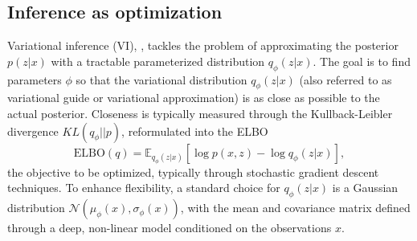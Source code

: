 \subsection{Inference as optimization}\label{sec:iasopt}

Variational inference (VI), \cite{kucukelbir2017automatic}, tackles the problem of approximating the posterior $p(z | x)$ with a tractable parameterized distribution $q_{\phi}(z|x)$. The goal is to find parameters $\phi$ so that the variational distribution $q_{\phi}(z|x)$  (also referred to as variational guide
or variational approximation)  is as close as possible to the actual posterior. Closeness is typically measured through 
the Kullback-Leibler 
divergence $KL(q_{\phi } || p)$, reformulated into the ELBO
\begin{equation}\label{eq:elbo}
\mbox{ELBO}(q) = \mathbb{E}_{q_{\phi}(z|x)} \left[ \log p(x,z) - \log q_{\phi}(z|x)\right],
\end{equation}
the objective to be optimized,
typically through stochastic gradient descent techniques. To enhance flexibility, a standard choice
for $q_{\phi}(z|x)$ is a Gaussian 
distribution $\mathcal{N}(\mu_{\phi}(x), \sigma_{\phi}(x))$,
with the mean and covariance matrix defined through a
 deep, non-linear model conditioned on the observations $x$.

